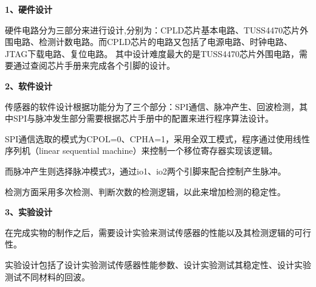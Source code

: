  \noindent
 \textbf{1、硬件设计}\par
硬件电路分为三部分来进行设计,分别为：CPLD芯片基本电路、TUSS4470芯片外围电路、检测计数电路。而CPLD芯片的电路又包括了电源电路、时钟电路、JTAG下载电路、复位电路。
其中设计难度最大的是TUSS4470芯片外围电路，需要通过查阅芯片手册来完成各个引脚的设计。\par
 \noindent
 \textbf{2、软件设计}\par
 传感器的软件设计根据功能分为了三个部分：SPI通信、脉冲产生、回波检测，其中SPI与脉冲发生部分需要根据芯片手册中的配置来进行程序算法设计。\par
 SPI通信选取的模式为CPOL=0、CPHA=1，采用全双工模式，程序通过使用线性序列机（linear sequential machine）来控制一个移位寄存器实现该逻辑。\par
 而脉冲产生则选择脉冲模式3，通过io1、io2两个引脚来配合控制产生脉冲。\par
 检测方面采用多次检测、判断次数的检测逻辑，以此来增加检测的稳定性。

 \noindent
 \textbf{3、实验设计}\par
 在完成实物的制作之后，需要设计实验来测试传感器的性能以及其检测逻辑的可行性。\par
 实验设计包括了设计实验测试传感器性能参数、设计实验测试其稳定性、设计实验测试不同材料的回波。
 
 